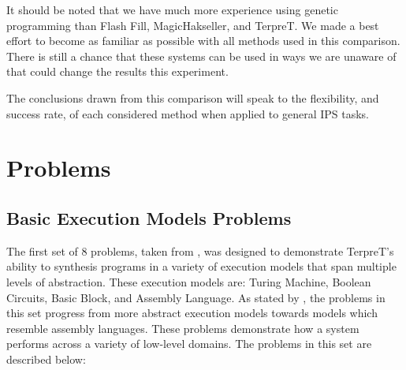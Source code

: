 It should be noted that we have much more experience using genetic programming than Flash Fill, MagicHakseller, and TerpreT. We made a best effort to become as familiar as possible with all methods used in this comparison. There is still a chance that these systems can be used in ways we are unaware of that could change the results this experiment.

The conclusions drawn from this comparison will speak to the flexibility, and success rate, of each considered method when applied to general IPS tasks.

\section{Problems}

\subsection{Basic Execution Models Problems}

The first set of 8 problems, taken from \cite{Gaunt2016}, was designed to demonstrate TerpreT's ability to synthesis programs in a variety of execution models that span multiple levels of abstraction. These execution models are: Turing Machine, Boolean Circuits, Basic Block, and Assembly Language. As stated by \cite{Gaunt2016}, the problems in this set progress from more abstract execution models towards models which resemble assembly languages. These problems demonstrate how a system performs across a variety of low-level domains. 
The problems in this set are described below:


